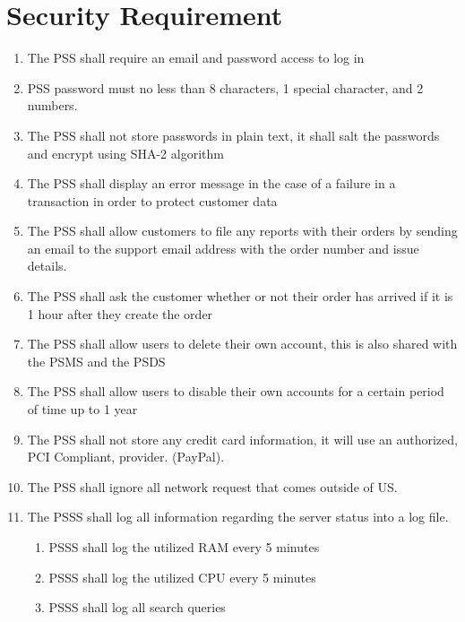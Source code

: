 \section{Security Requirement}

\begin{enumerate}[label=SEC-\arabic*]
    \item The PSS shall require an email and password access to log in
    \item PSS password must no less than 8 characters, 1 special character, and 2 numbers.
    \item The PSS shall not store passwords in plain text, it shall salt the passwords and encrypt using SHA-2 algorithm
    \item The PSS shall display an error message in the case of a failure in a transaction in order to protect customer data
    \item The PSS shall allow customers to file any reports with their orders by sending an email to the support email address with the order number and issue details.
    \item The PSS shall ask the customer whether or not their order has arrived if it is 1 hour after they create the order
    \item The PSS shall allow users to delete their own account, this is also shared with the PSMS and the PSDS
    \item The PSS shall allow users to disable their own accounts for a certain period of time up to 1 year
    \item The PSS shall not store any credit card information, it will use an authorized, PCI Compliant, provider. (PayPal).
    \item The PSS shall ignore all network request that comes outside of US.
    \item The PSSS shall log all information regarding the server status into a log file.
    \begin{enumerate}[label=SEC-11.\arabic*]
        \item PSSS shall log the utilized RAM every 5 minutes 
        \item PSSS shall log the utilized CPU every 5 minutes
        \item PSSS shall log all search queries
    \end{enumerate}
\end{enumerate}
\pagebreak

